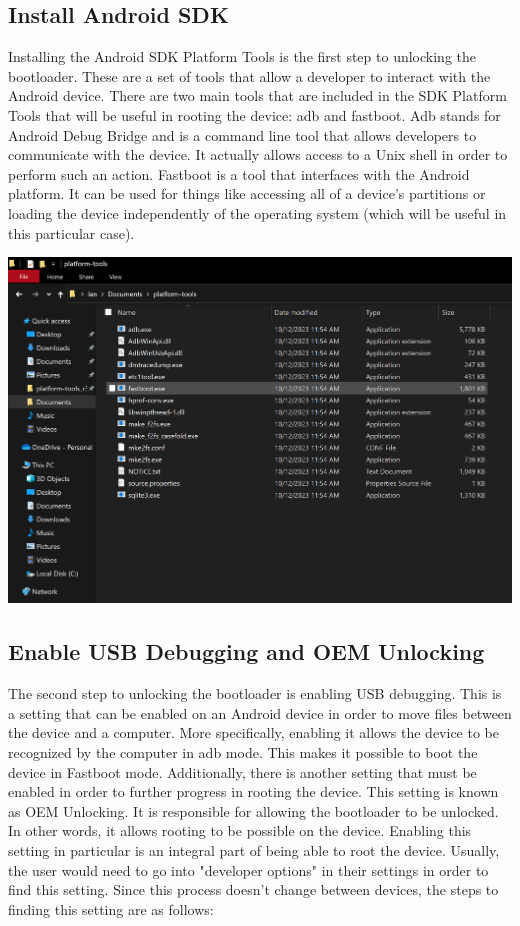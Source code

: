 \subsection{Install Android SDK}
Installing the Android SDK Platform Tools is the first step to unlocking the bootloader. These are a set of tools that allow a developer to interact with the Android device.
There are two main tools that are included in the SDK Platform Tools that will be useful in rooting the device: adb and fastboot. Adb stands for Android Debug Bridge and is 
a command line tool that allows developers to communicate with the device. It actually allows access to a Unix shell in order to perform such an action. Fastboot is a tool that 
interfaces with the Android platform. It can be used for things like accessing all of a device's partitions or loading the device independently of the operating system 
(which will be useful in this particular case).


\includegraphics{images/PlatformTools}

\subsection{Enable USB Debugging and OEM Unlocking}
The second step to unlocking the bootloader is enabling USB debugging. This is a setting that can be enabled on an Android device in order to move files between the device 
and a computer. More specifically, enabling it allows the device to be recognized by the computer in adb mode. This makes it possible to boot the device in Fastboot mode. 
Additionally, there is another setting that must be enabled in order to further progress in rooting the device. This setting is known as OEM Unlocking. It is 
responsible for allowing the bootloader to be unlocked. In other words, it allows rooting to be possible on the device. Enabling this setting in particular is an integral
part of being able to root the device. Usually, the user would need to go into "developer options" in their settings in order to find this setting. Since this process 
doesn't change between devices, the steps to finding this setting are as follows: 

